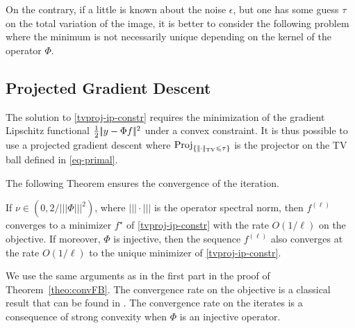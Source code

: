 \documentclass[11pt,nofonttune,a4paper]{IEEEtran}
\DeclareMathOperator{\Proj}{Proj}
\newcommand{\opnorm}[1]{\big|\!\big|\!\big|#1\big|\!\big|\!\big|}
\begin{document}
On the contrary, if a little is known about the noise $\epsilon$, but one has some guess $\tau$ on the total variation of the image, it is better to consider the following problem
where the minimum is not necessarily unique depending on the kernel of the operator $\Phi$.


\subsection{Projected Gradient Descent}

The solution to \eqref{tvproj-ip-constr} requires the minimization of the gradient Lipschitz functional $\frac{1}{2}|\!| y - \Phi f |\!|^2$ under a convex constraint. It is thus possible to use a projected gradient descent 
\eql{\label{eq-proj-grad}
	f^{(\ell+1)} = \Proj_{\{\normTV{\cdot} \leq \tau\}} \pa{
		f^{(\ell)} + \nu \Phi^* ( y-\Phi f^{(\ell)} )
	},
}
where $\Proj_{\{\normTV{\cdot} \leq \tau\}}$ is the projector on the TV ball defined in \eqref{eq-primal}.

The following Theorem ensures the convergence of the iteration.

\begin{thm}
\label{theo:projdescent}
If $\nu \in (0,2 / \opnorm{\Phi}^2)$, where $\opnorm{\cdot}$ is the operator spectral norm, then $f^{(\ell)}$ converges to a minimizer $f^\star$ of \eqref{tvproj-ip-constr} with the rate $O(1/\ell)$ on the objective. If moreover, $\Phi$ is injective, then the sequence $f^{(\ell)}$ also converges at the rate $O(1/\ell)$ to the unique minimizer of \eqref{tvproj-ip-constr}.
\end{thm}
\begin{IEEEproof}
We use the same arguments as in the first part in the proof of Theorem~\ref{theo:convFB}. The convergence rate on the objective is a classical result that can be found in \cite{Polyak87}. The convergence rate on the iterates is a consequence of strong convexity when $\Phi$ is an injective operator.
\end{IEEEproof}
\end{document}
